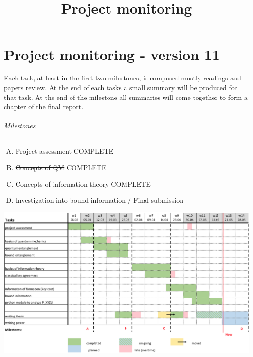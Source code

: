 \documentclass{article}
\title{Project monitoring}
\begin{document}
\part*{Project monitoring - version 11}
Each task, at least in the first two milestones, is composed mostly readings and papers review.
At the end of each tasks a small summary will be produced for that task. 
At the end of the milestone all summaries will come together to form a chapter of the final report. \\

\paragraph*{Milestones}
\begin{enumerate}[A)]
\item \sout{Project assessment} COMPLETE 
\item \sout{Concepts of QM} COMPLETE
\item \sout{Concepts of information theory} COMPLETE
\item Investigation into bound information / Final submission
\end{enumerate}

\centerline{
	\includegraphics[scale=0.5]{gantt-11.png}
}
\end{document}
